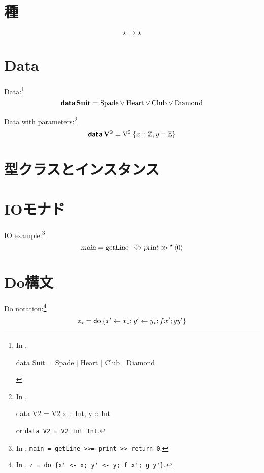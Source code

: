 \documentclass[platex,a5paper,twoside,fleqn,draft]{jsbook}
\begin{document}
\section{種}

\begin{equation}
\star\rightarrow\star
\end{equation}

\section{Data}

Data:\footnote{In \haskell,
\begin{footcode}
data Suit = Spade | Heart | Club | Diamond
\end{footcode}}
\begin{equation}
\mathop{\textbf{\textsf{data}}}\mathbf{Suit}=\mathord{\mathrm{Spade}}\vee\mathord{\mathrm{Heart}}\vee\mathord{\mathrm{Club}}\vee\mathord{\mathrm{Diamond}}
\end{equation}

Data with parameters:\footnote{In \haskell,
\begin{footcode}
data V2 = V2 { x :: Int, y :: Int}
\end{footcode}
or \verb|data V2 = V2 Int Int|.}
\begin{equation}
\mathop{\textbf{\textsf{data}}}\mathbf{V^2}=\mathord{\mathrm{V^2}}\left\{x::\mathord{\mathbb{Z}},y::\mathord{\mathbb{Z}}\right\}
\end{equation}

\section{型クラスとインスタンス}

\section{IOモナド}

IO example:\footnote{In \haskell, \verb|main = getLine >>= print >> return 0|.}
\begin{equation}
\mathMain=\mathGetLine\mathBindRight\mathPrint\mathNext\mathMakeReturn{0}
\end{equation}

\section{Do構文}

Do notation:\footnote{In \haskell, \verb|z = do {x' <- x; y' <- y; f x'; g y'}|.}
\begin{equation}
z_\star=\mathord{\textsf{do}}\left\{x'\leftarrow x_\star;y'\leftarrow y_\star;fx';gy'\right\}
\end{equation}
\end{document}
